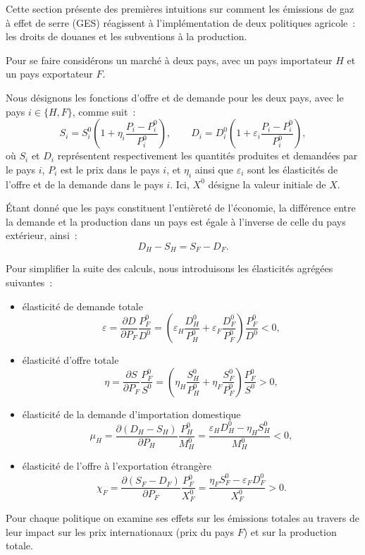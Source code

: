 Cette section présente des premières intuitions sur comment les émissions de gaz à effet de serre (GES) réagissent à l'implémentation de deux politiques agricole~: les droits de douanes et les subventions à la production.

Pour se faire considérons un marché à deux pays, avec un pays importateur $H$ et un pays exportateur $F$.

Nous désignons les fonctions d'offre et de demande pour les deux pays, avec le pays $i \in \{H, F\}$, comme suit~:
$$
    S_i = S_i^0\left(1 + \eta_i\frac{P_i - P_i^0}{P_i^0}\right), \qquad
    D_i = D_i^0\left(1 + \varepsilon_i\frac{P_i - P_i^0}{P_i^0}\right),
$$
où $S_i$ et $D_i$ représentent respectivement les quantités produites et demandées par le pays $i$, $P_i$ est le prix dans le pays $i$, et $\eta_i$ ainsi que $\varepsilon_i$ sont les élasticités de l'offre et de la demande dans le pays $i$. Ici, $X^0$ désigne la valeur initiale de $X$.

Étant donné que les pays constituent l'entièreté de l'économie, la différence entre la demande et la production dans un pays est égale à l'inverse de celle du pays extérieur, ainsi~:
$$
    D_H - S_H = S_F - D_F.
$$

Pour simplifier la suite des calculs, nous introduisons les élasticités agrégées suivantes~:
\begin{itemize}
    \item élasticité de demande totale
          $$
              \varepsilon = \frac{\partial D}{\partial P_F} \frac{P_F^0}{D^0} = \left( \varepsilon_H \frac{D_H^0}{P_H^0} + \varepsilon_F \frac{D_F^0}{P_F^0} \right)\frac{P_F^0}{D^0} < 0,
          $$
    \item élasticité d'offre totale
          $$
              \eta = \frac{\partial S}{\partial P_F} \frac{P_F^0}{S^0} = \left( \eta_H \frac{S_H^0}{P_H^0} + \eta_F \frac{S_F^0}{P_F^0} \right)\frac{P_F^0}{S^0} > 0,
          $$
    \item élasticité de la demande d'importation domestique
          $$
              \mu_H = \frac{\partial (D_H - S_H)}{\partial P_H} \frac{P_H^0}{M_H^0} = \frac{\varepsilon_H D_H^0 - \eta_H S_H^0}{M_H^0} < 0,
          $$
    \item élasticité de l'offre à l'exportation étrangère
          $$
              \chi_F = \frac{\partial (S_F - D_F)}{\partial P_F} \frac{P_F^0}{X_F^0} = \frac{\eta_F S_F^0 - \varepsilon_F D_F^0}{X_F^0} > 0.
          $$
\end{itemize}

Pour chaque politique on examine ses effets sur les émissions totales au travers de leur impact sur les prix internationaux (prix du pays $F$) et sur la production totale.

